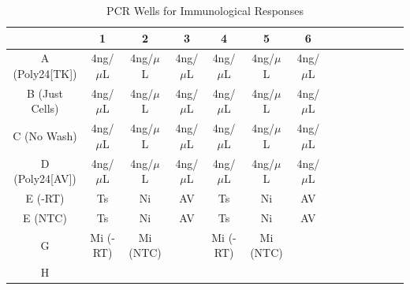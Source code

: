 \documentclass[journal, a4paper]{IEEEtran}
\begin{document}
  \begin{table}[!hbt]
    \begin{center}
    \caption{PCR Wells for Immunological Responses}
    \label{tab:simParameters}
    \begin{tabular}{|c|c|c|c|c|c|c|c|c|c|c|c|c|c|}
      \hline
      & 1 & 2 & 3 & 4 & 5 & 6\\
      \hline
      A (Poly24[TK]) & 4ng/$\mu$L & 4ng/$\mu$L & 4ng/$\mu$L & 4ng/$\mu$L & 4ng/$\mu$L & 4ng/$\mu$L\\
      \hline
      B (Just Cells) & 4ng/$\mu$L & 4ng/$\mu$L & 4ng/$\mu$L & 4ng/$\mu$L & 4ng/$\mu$L & 4ng/$\mu$L\\
      \hline
      C (No Wash) & 4ng/$\mu$L & 4ng/$\mu$L & 4ng/$\mu$L & 4ng/$\mu$L & 4ng/$\mu$L & 4ng/$\mu$L\\
      \hline
      D (Poly24[AV]) & 4ng/$\mu$L & 4ng/$\mu$L & 4ng/$\mu$L & 4ng/$\mu$L & 4ng/$\mu$L & 4ng/$\mu$L\\
      \hline
      E (-RT) & Ts & Ni & AV & Ts & Ni & AV\\
      \hline
      E (NTC) & Ts & Ni & AV & Ts & Ni & AV\\
      \hline
      G & Mi (-RT) & Mi (NTC) & & Mi (-RT) & Mi (NTC) & \\
      \hline
      H & & & & & &\\
      \hline
    \end{tabular}
    \end{center}
  \end{table}
\end{document}
